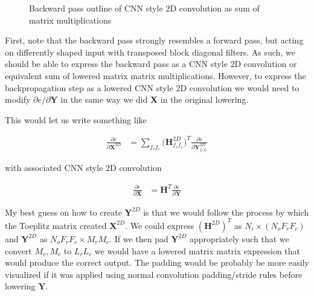 \documentclass[11pt]{article}
\newcommand{\pd}{\partial}
\newcommand{\bs}{\boldsymbol}
\begin{document}
\begin{solution}
\begin{figure}[H]
	\caption{Backward pass outline of CNN style 2D convolution as sum of matrix
		multiplications}
	\end{figure}

	First, note that the backward pass strongly resembles a
	forward pass, but acting on differently shaped input with transposed
	block diagonal filters. As such, we should be able to express
	the backward pass as a CNN
	style 2D convolution or equivalent sum of lowered matrix matrix
	multiplications. However, to express the backpropagation step as a lowered
	CNN style 2D convolution we would need to modify $\pd e / \pd\bs{Y}$ in the
	same way we did $\bs{X}$ in the original lowering.
	\newline

	This would let us write something like

	\begin{align}
		\frac{\pd e}{\pd\bs{X}^{2D}}
		&=
		\sum_{f_rf_c}\bigg(\bs{H}_{f_rf_c}^{2D}\bigg)^T
		\frac{\pd e}{\pd \bs{Y}_{f_rf_c}^{2D}}
	\end{align}

	with associated CNN style 2D convolution

	\begin{align}
		\frac{\pd e}{\pd\bs{X}}
		&=
		\bs{H}^T
		\frac{\pd e}{\pd \bs{Y}}
	\end{align}

	My best guess on how to create $\bs{Y}^{2D}$ is that we would
	follow the process by which the Toeplitz matrix created $\bs{X}^{2D}$.
	We could express $(\bs{H}^{2D})^T$ as $N_i \times (N_o F_r F_c)$ and
	$\bs{Y}^{2D}$ as $N_o F_r F_c \times M_r M_c$. If we then pad $\bs{Y}^{2D}$
	appropriately such that we convert $M_r, M_c$ to $L_r L_c$ we would have a
	lowered matrix matrix expression that would produce the correct output. The
	padding would be probably be more easily visualized if it was applied using
	normal convolution padding/stride rules before lowering $\bs{Y}$.



\end{solution}
\end{document}
